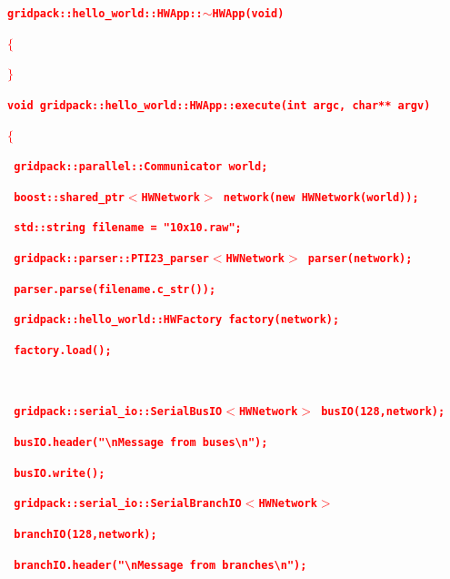 \documentclass[12pt]{report} %
\begin{document}
\textcolor{red}{\texttt{\textbf{gridpack::hello\_world::HWApp::$\boldsymbol{\mathrm{\sim}}$HWApp(void)}}}

\textcolor{red}{\texttt{\textbf{$\boldsymbol{\mathrm{\{}}$}}}

\textcolor{red}{\texttt{\textbf{$\boldsymbol{\mathrm{\}}}$}}}

\textcolor{red}{\texttt{\textbf{}}}

\textcolor{red}{\texttt{\textbf{void gridpack::hello\_world::HWApp::execute(int argc, char** argv)}}}

\textcolor{red}{\texttt{\textbf{$\boldsymbol{\mathrm{\{}}$}}}

\textcolor{red}{\texttt{\textbf{  gridpack::parallel::Communicator world;}}}

\textcolor{red}{\texttt{\textbf{  boost::shared\_ptr$\boldsymbol{\mathrm{<}}$HWNetwork$\boldsymbol{\mathrm{>}}$ network(new HWNetwork(world));}}}

\textcolor{red}{\texttt{\textbf{}}}

\textcolor{red}{\texttt{\textbf{  std::string filename = "10x10.raw";}}}

\textcolor{red}{\texttt{\textbf{  gridpack::parser::PTI23\_parser$\boldsymbol{\mathrm{<}}$HWNetwork$\boldsymbol{\mathrm{>}}$ parser(network);}}}

\textcolor{red}{\texttt{\textbf{  parser.parse(filename.c\_str());}}}

\textcolor{red}{\texttt{\textbf{  gridpack::hello\_world::HWFactory factory(network);}}}

\textcolor{red}{\texttt{\textbf{  factory.load();}}}

\textcolor{red}{\texttt{\textbf{  }}}

\textcolor{red}{\texttt{\textbf{  gridpack::serial\_io::SerialBusIO$\boldsymbol{\mathrm{<}}$HWNetwork$\boldsymbol{\mathrm{>}}$ busIO(128,network);}}}

\textcolor{red}{\texttt{\textbf{  busIO.header("{\textbackslash}nMessage from buses{\textbackslash}n");}}}

\textcolor{red}{\texttt{\textbf{  busIO.write();}}}

\textcolor{red}{\texttt{\textbf{  gridpack::serial\_io::SerialBranchIO$\boldsymbol{\mathrm{<}}$HWNetwork$\boldsymbol{\mathrm{>}}$}}}

\textcolor{red}{\texttt{\textbf{    branchIO(128,network);}}}

\textcolor{red}{\texttt{\textbf{  branchIO.header("{\textbackslash}nMessage from branches{\textbackslash}n");}}}
\end{document}
